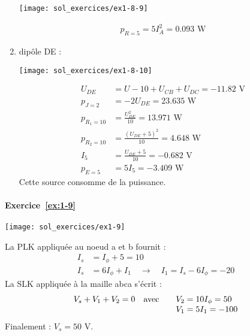 \begin{enumerate}
	\begin{minipage}[c]{5cm}
		\begin{center}
			\texttt{[image: sol\_exercices/ex1-8-9]}
		\end{center}
	\end{minipage}
	\begin{minipage}[c]{5cm}
		\begin{align*}
		p_{R=5}=5I_A^2=0.093\, \, \text{W}
		\end{align*}
	\end{minipage}
	
	
	\item dipôle DE :
	
	\begin{minipage}[c]{5cm}
		\begin{center}
			\texttt{[image: sol\_exercices/ex1-8-10]}
		\end{center}
	\end{minipage}
	\begin{minipage}[c]{5cm}
		\begin{align*}
		U_{DE}&=U-10+U_{CB}+U_{DC}= -11.82\, \, \text{V}\\
		p_{J=2}&=-2U_{DE}=23.635\, \, \text{W}\\
		p_{R_1=10}&=\frac{U_{DE}^2}{10}= 13.971\, \, \text{W}\\
		p_{R_2=10}&=\frac{(U_{DE}+5)^2}{10}= 4.648\, \, \text{W}\\
		I_5&=\frac{U_{DE}+5}{10}=-0.682\, \, \text{V}\\
		p_{E=5}&=5I_5= -3.409\, \, \text{W}
		\end{align*}
		Cette source consomme de la puissance.
	\end{minipage}
\end{enumerate}


\paragraph{Exercice~\ref{ex:1-9}}
\begin{center}
	\texttt{[image: sol\_exercices/ex1-9]}
\end{center}
La PLK appliquée au noeud a et b fournit :
\begin{align*}
I_s&=I_{\phi}+5 = 10\\
I_s&=6I_{\phi} + I_1 \quad \rightarrow \quad I_1 = I_s-6I_{\phi}=-20
\end{align*}
La SLK appliquée à la maille abca s'écrit :
\[\begin{array}[t]{ll}
V_s+V_1+V_2=0 \quad \text{avec} \quad & V_2=10I_{\phi} = 50\\
& V_1 = 5I_1= -100 \end{array}\]
Finalement : $V_s=50$ V.
